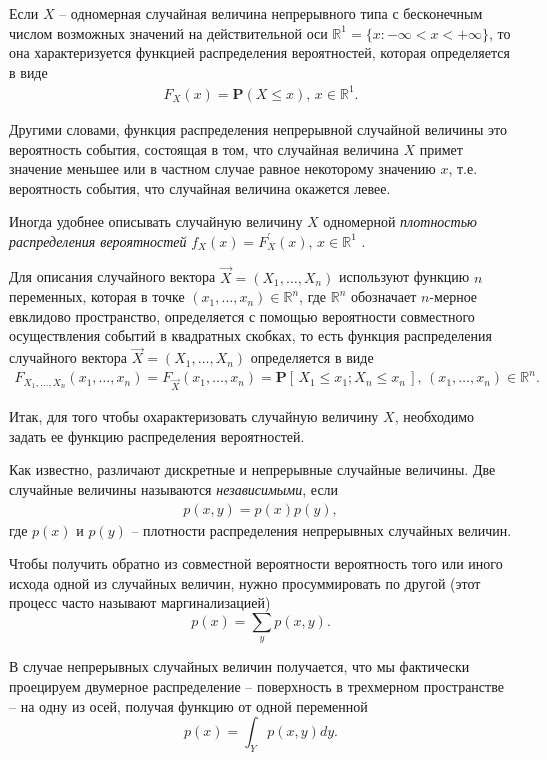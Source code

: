 \documentclass[%
	11pt,
	a4paper,
	utf8,
		]{article}
\begin{document}
Если $ X $ -- одномерная случайная величина непрерывного типа с бесконечным числом возможных значений на действительной оси $ \mathbb{R}^1 = \{x: -\infty < x < +\infty\} $, то она характеризуется функцией распределения вероятностей, которая определяется в виде
\begin{align*}
	F_X(x) = \mathbf{P}(X \leqslant x), \, x \in \mathbb{R}^1.
\end{align*}

Другими словами, функция распределения непрерывной случайной величины это вероятность события, состоящая в том, что случайная величина $ X $ примет значение меньшее или в частном случае равное некоторому значению $ x $, т.е. вероятность события, что случайная величина окажется левее.

Иногда удобнее описывать случайную величину $ X $ одномерной \emph{плотностью распределения вероятностей} $ f_X(x) = F_X^{'}(x), \, x \in \mathbb{R}^1 $ .

Для описания случайного вектора $ \vec{X} = (X_1, \dots, X_n) $ используют функцию $ n $ переменных, которая в точке $ (x_1, \dots, x_n) \in \mathbb{R}^n $, где $ \mathbb{R}^n $ обозначает $ n $-мерное евклидово пространство, определяется с помощью вероятности совместного осуществления событий в квадратных скобках, то есть функция распределения случайного вектора $ \vec{X} = (X_1, \dots, X_n) $ определяется в виде
\begin{align*}
	F_{X_1, \dots, X_n}(x_1, \dots, x_n) = F_{\vec{X}}(x_1, \dots, x_n) = \mathbf{P}[\,X_1 \leqslant x_1; X_n \leqslant x_n\,], \, (x_1, \dots, x_n) \in \mathbb{R}^n.
\end{align*}

Итак, для того чтобы охарактеризовать случайную величину $ X $, необходимо задать ее функцию распределения вероятностей.

Как известно, различают дискретные и непрерывные случайные величины. Две случайные величины называются \emph{независимыми}, если
\begin{align*}
	p(x,y) = p(x)p(y),
\end{align*}
где $ p(x) $ и $ p(y) $ -- плотности распределения непрерывных случайных величин.

Чтобы получить обратно из совместной вероятности вероятность того или иного исхода одной из случайных величин, нужно просуммировать по другой (этот процесс часто называют маргинализацией)
$$
p(x) = \sum_{y} p(x, y).
$$

В случае непрерывных случайных величин получается, что мы фактически проецируем двумерное распределение -- поверхность в трехмерном пространстве -- на одну из осей, получая функцию от одной переменной
$$
p(x) = \int_{Y} p(x, y)dy.
$$
\end{document}
